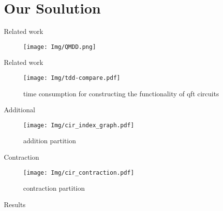 \documentclass[aspectratio=1610]{beamer}
\begin{document}
\section{Our Soulution}
\begin{frame}{Related work}
    \begin{figure}
      \texttt{[image: Img/QMDD.png]}
    \end{figure}
  \end{frame}
\begin{frame}{Related work}
    \begin{figure}
        \texttt{[image: Img/tdd-compare.pdf]}
        \caption{ time consumption for constructing the functionality of qft circuits}
    \end{figure}
\end{frame}
\begin{frame}{Additional}
    \begin{figure}
        \centering
        \texttt{[image: Img/cir\_index\_graph.pdf]}
        \caption{ addition partition}
    \end{figure}
\end{frame}
\begin{frame}{Contraction}
    \begin{figure}
        \centering
        \texttt{[image: Img/cir\_contraction.pdf]}
        \caption{ contraction partition}
    \end{figure}
\end{frame}
\begin{frame}{Results}
    \begin{table}[]
        \caption{Quantum Image computation}
    \end{table}
\end{frame}
\end{document}
